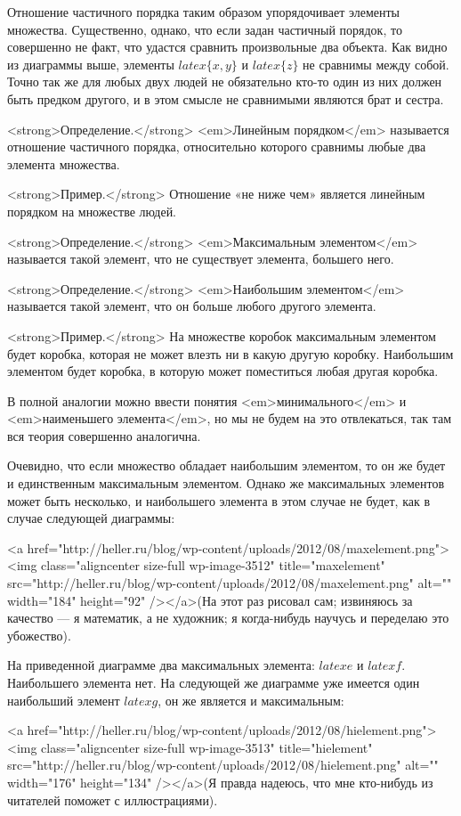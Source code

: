 Отношение частичного порядка таким образом упорядочивает элементы множества. Существенно, однако, что если задан частичный порядок, то совершенно не факт, что удастся сравнить произвольные два объекта. Как видно из диаграммы выше, элементы $latex \{x, y\}$ и $latex \{z\}$ не сравнимы между собой. Точно так же для любых двух людей не обязательно кто-то один из них должен быть предком другого, и в этом смысле не сравнимыми являются брат и сестра.

<strong>Определение.</strong> <em>Линейным порядком</em> называется отношение частичного порядка, относительно которого сравнимы любые два элемента множества.

<strong>Пример.</strong> Отношение «не ниже чем» является линейным порядком на множестве людей.

<strong>Определение.</strong> <em>Максимальным элементом</em> называется такой элемент, что не существует элемента, большего него.

<strong>Определение.</strong> <em>Наибольшим элементом</em> называется такой элемент, что он больше любого другого элемента.

<strong>Пример.</strong> На множестве коробок максимальным элементом будет коробка, которая не может влезть ни в какую другую коробку. Наибольшим элементом будет коробка, в которую может поместиться любая другая коробка.

В полной аналогии можно ввести понятия <em>минимального</em> и <em>наименьшего элемента</em>, но мы не будем на это отвлекаться, так там вся теория совершенно аналогична.

Очевидно, что если множество обладает наибольшим элементом, то он же будет и единственным максимальным элементом. Однако же максимальных элементов может быть несколько, и наибольшего элемента в этом случае не будет, как в случае следующей диаграммы:

<a href="http://heller.ru/blog/wp-content/uploads/2012/08/maxelement.png"><img class="aligncenter size-full wp-image-3512" title="maxelement" src="http://heller.ru/blog/wp-content/uploads/2012/08/maxelement.png" alt="" width="184" height="92" /></a>(На этот раз рисовал сам; извиняюсь за качество — я математик, а не художник; я когда-нибудь научусь и переделаю это убожество).

На приведенной диаграмме два максимальных элемента: $latex e$ и $latex f$. Наибольшего элемента нет. На следующей же диаграмме уже имеется один наибольший элемент $latex g$, он же является и максимальным:

<a href="http://heller.ru/blog/wp-content/uploads/2012/08/hielement.png"><img class="aligncenter size-full wp-image-3513" title="hielement" src="http://heller.ru/blog/wp-content/uploads/2012/08/hielement.png" alt="" width="176" height="134" /></a>(Я правда надеюсь, что мне кто-нибудь из читателей поможет с иллюстрациями).

